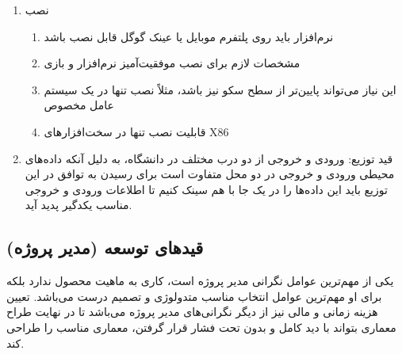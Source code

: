 \begin{enumerate}
    \item نصب
    \begin{enumerate}
        \item نرم‌افزار باید روی پلتفرم موبایل یا عینک گوگل قابل نصب باشد
        \item مشخصات لازم برای نصب موفقیت‌آمیز نرم‌افزار و بازی
        \item این نیاز می‌تواند پایین‌تر از سطح سکو نیز باشد، مثلاً نصب تنها در
        یک سیستم عامل مخصوص
        \item قابلیت نصب تنها در سخت‌افزار‌های X86
    \end{enumerate}
    \item قید توزیع: ورودی و خروجی از دو درب مختلف در دانشگاه، به دلیل آنکه
    داده‌های محیطی ورودی و خروجی در دو محل متفاوت است برای رسیدن به توافق در این
    توزیع باید این داده‌ها را در یک جا با هم سینک کنیم تا اطلاعات ورودی و خروجی
    مناسب یکدگیر پدید آید.
\end{enumerate}

\subsection{قید‌های توسعه  (مدیر پروژه)}

یکی از مهم‌ترین عوامل نگرانی مدیر پروژه است، کاری به ماهیت محصول ندارد بلکه برای
او مهم‌ترین عوامل انتخاب مناسب متدولوژی و تصمیم درست می‌باشد. تعیین هزینه زمانی
و مالی نیز از دیگر نگرانی‌های مدیر پروژه می‌باشد تا در نهایت طراح معماری بتواند
با دید کامل و بدون تحت فشار قرار گرفتن، معماری مناسب را طراحی کند.